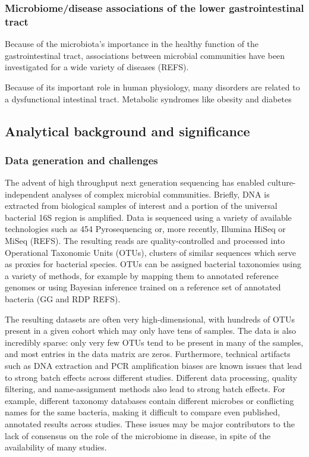 \documentclass[12pt]{article}
\begin{document}
\subsubsection{Microbiome/disease associations of the lower gastrointestinal tract}
Because of the microbiota's importance in the healthy function of the gastrointestinal tract, associations between microbial communities have been investigated for a wide variety of diseases (REFS). 

Because of its important role in human physiology, many disorders are related to a dysfunctional intestinal tract. Metabolic syndromes like obesity and diabetes 

\subsection{Analytical background and significance}

\subsubsection{Data generation and challenges}
The advent of high throughput next generation sequencing has enabled culture-independent analyses of complex microbial communities. Briefly, DNA is extracted from biological samples of interest and a portion of the universal bacterial 16S region is amplified. Data is sequenced using a variety of available technologies such as 454 Pyrosequencing or, more recently, Illumina HiSeq or MiSeq (REFS). The resulting reads are quality-controlled and processed into Operational Taxonomic Units (OTUs), clusters of similar sequences which serve as proxies for bacterial species. OTUs can be assigned bacterial taxonomies using a variety of methods, for example by mapping them to annotated reference genomes or using Bayesian inference trained on a reference set of annotated bacteria (GG and RDP REFS). 

The resulting datasets are often very high-dimensional, with hundreds of OTUs present in a given cohort which may only have tens of samples. The data is also incredibly sparse: only very few OTUs tend to be present in many of the samples, and most entries in the data matrix are zeros. Furthermore, technical artifacts such as DNA extraction and PCR amplification biases are known issues that lead to strong batch effects across different studies. Different data processing, quality filtering, and name-assignment methods also lead to strong batch effects. For example, different taxonomy databases contain different microbes or conflicting names for the same bacteria, making it difficult to compare even published, annotated results across studies.  These issues may be major contributors to the lack of consensus on the role of the microbiome in disease, in spite of the availability of many studies.
\end{document}
